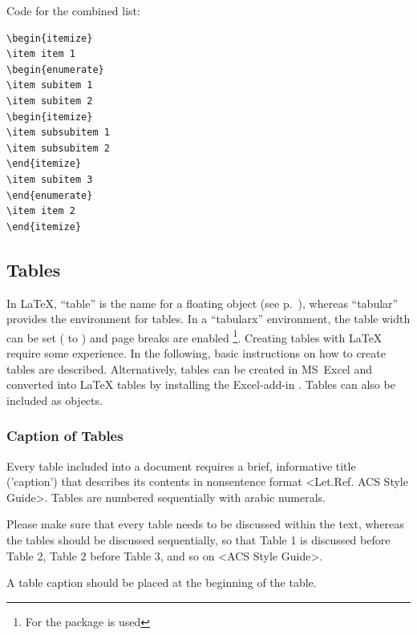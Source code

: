 Code for the combined list:
\begin{verbatim}
\begin{itemize}
\item item 1
\begin{enumerate}
\item subitem 1
\item subitem 2
\begin{itemize}
\item subsubitem 1
\item subsubitem 2
\end{itemize}
\item subitem 3
\end{enumerate}
\item item 2
\end{itemize}
\end{verbatim}

\subsection{Tables}
In \LaTeX{}, \enquote{table} is the name for a floating object (see p.~\pageref{subsubsec:TableFloating}), whereas
\enquote{tabular} provides the environment for tables. In a \enquote{tabularx} environment, the table width can be set (\eg
to ) and page breaks are enabled \footnote{For \PharmRep the package  is used}.
Creating tables with \LaTeX{} require some experience. In the following, basic instructions on how to create
tables are described. Alternatively, tables can be created in MS~Excel and converted into \LaTeX{} tables by
installing the Excel-add-in . Tables can also be included as objects.

\subsubsection{Caption of Tables}
Every table included into a document requires a brief, informative title ('caption') that describes its
contents in nonsentence format <Let.Ref. ACS Style Guide>.  Tables are numbered sequentially with
arabic numerals.

Please make sure that every table needs to be discussed within the text, whereas the tables should be
discussed sequentially, so that Table 1 is discussed before Table 2, Table 2 before Table 3, and so on
<ACS Style Guide>.

A table caption should be placed at the beginning of the table.

